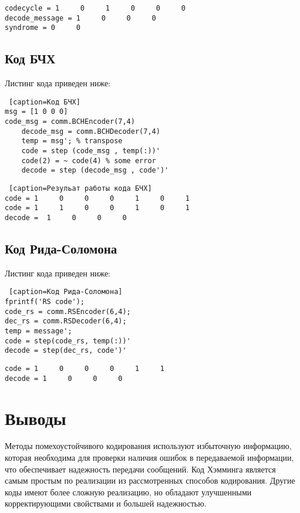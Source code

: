 \documentclass[10pt,a4paper,oneside]{article}
\begin{document}
\begin{lstlisting}[caption=Результат циклического кодирования]
codecycle = 1     0     1     0     0     0
decode_message = 1     0     0     0
syndrome = 0     0
\end{lstlisting}

\newpage
\subsection{Код БЧХ}
Листинг кода приведен ниже:
\begin{lstlisting} [caption=Код БЧХ]
msg = [1 0 0 0]
code_msg = comm.BCHEncoder(7,4) 
	decode_msg = comm.BCHDecoder(7,4) 
	temp = msg'; % transpose
	code = step (code_msg , temp(:))' 
	code(2) = ~ code(4) % some error
	decode = step (decode_msg , code')'
\end{lstlisting}
\begin{lstlisting} [caption=Резульат работы кода БЧХ]
code = 1     0     0     0     1     0     1
code = 1     1     0     0     1     0     1
decode =  1     0     0     0
\end{lstlisting}
\subsection{Код Рида-Соломона}
Листинг кода приведен ниже:
\begin{lstlisting} [caption=Код Рида-Соломона]
fprintf('RS code');
code_rs = comm.RSEncoder(6,4);
dec_rs = comm.RSDecoder(6,4);
temp = message';
code = step(code_rs, temp(:))'
decode = step(dec_rs, code')'
\end{lstlisting}
\begin{lstlisting}[caption=Резульат работы кода Рида-Соломона]
code = 1     0     0     0     1     1
decode = 1     0     0     0
\end{lstlisting}

\section{Выводы}
Методы помехоустойчивого кодирования используют избыточную информацию, которая необходима для проверки наличия ошибок в передаваемой информации, что обеспечивает надежность передачи сообщений. Код Хэмминга является самым простым по реализации из рассмотренных способов кодирования. Другие коды имеют более сложную реализацию, но обладают улучшенными корректирующими свойствами и большей надежностью.
\end{document}
